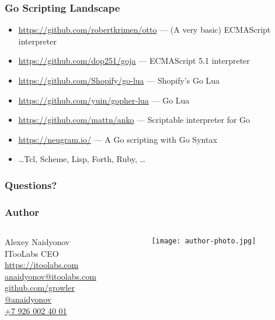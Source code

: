 \documentclass[
   12pt, background = clouds, fonts = fira, 4k
]{itoolabs-beamer}
\begin{document}
\begin{frame}[c]
  \frametitle{Go Scripting Landscape}
  \small\begin{itemize}
  \item \url{https://github.com/robertkrimen/otto} --- (A very basic) ECMAScript interpreter
    \pause%
  \item \url{https://github.com/dop251/goja} --- ECMAScript 5.1 interpreter
    \pause%
  \item \url{https://github.com/Shopify/go-lua} --- Shopify's Go Lua
    \pause%
  \item \url{https://github.com/yuin/gopher-lua} --- Go Lua
    \pause%
  \item \url{https://github.com/mattn/anko} --- Scriptable interpreter for Go
    \pause%
  \item \url{https://neugram.io/} --- A Go scripting with Go Syntax
    \pause%
  \item \ldots Tcl, Scheme, Lisp, Forth, Ruby, \ldots
  \end{itemize}
\end{frame}

\begin{frame}[c]
  \frametitle{Questions?}
  \begin{center}
  \end{center}
\end{frame}

\begin{frame}[c]
  \frametitle{Author}
  \begin{columns}[c,widths={2,3}]
    \begin{column}
      Alexey Naidyonov \\
      ITooLabs CEO \\
      \url{https://itoolabs.com} \\
      \href{mailto:anaidyonov@itoolabs.com}{anaidyonov@itoolabs.com} \\
      \href{https://github.com/growler}{github.com/growler}\\
      \href{https://telegram.me/anaidyonov}{@anaidyonov}\\
      \href{tel:+79260024001}{+7 926 002 40 01}
    \end{column}
    \begin{column}
      \centering\texttt{[image: author-photo.jpg]}
    \end{column}
  \end{columns}
\end{frame}
\end{document}
